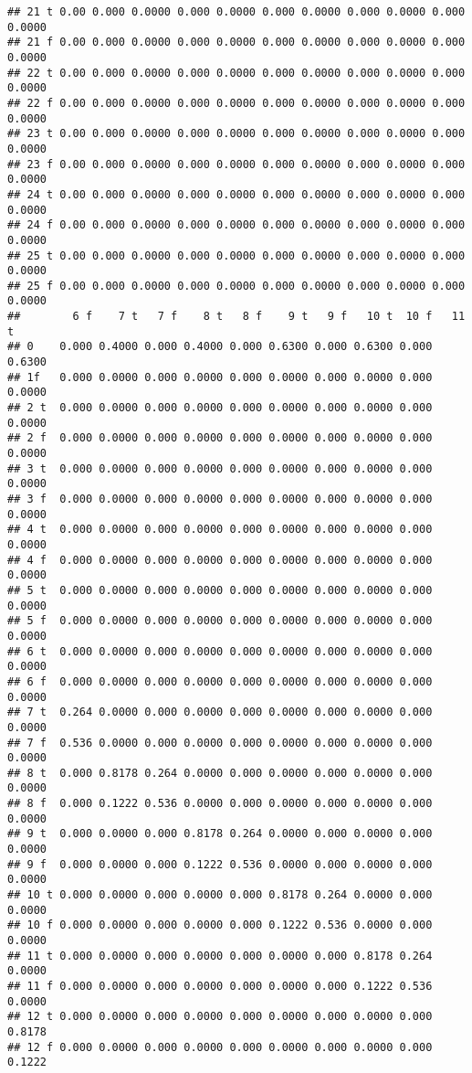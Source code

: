 \documentclass[]{article}
\begin{document}
\begin{verbatim}
## 21 t 0.00 0.000 0.0000 0.000 0.0000 0.000 0.0000 0.000 0.0000 0.000 0.0000
## 21 f 0.00 0.000 0.0000 0.000 0.0000 0.000 0.0000 0.000 0.0000 0.000 0.0000
## 22 t 0.00 0.000 0.0000 0.000 0.0000 0.000 0.0000 0.000 0.0000 0.000 0.0000
## 22 f 0.00 0.000 0.0000 0.000 0.0000 0.000 0.0000 0.000 0.0000 0.000 0.0000
## 23 t 0.00 0.000 0.0000 0.000 0.0000 0.000 0.0000 0.000 0.0000 0.000 0.0000
## 23 f 0.00 0.000 0.0000 0.000 0.0000 0.000 0.0000 0.000 0.0000 0.000 0.0000
## 24 t 0.00 0.000 0.0000 0.000 0.0000 0.000 0.0000 0.000 0.0000 0.000 0.0000
## 24 f 0.00 0.000 0.0000 0.000 0.0000 0.000 0.0000 0.000 0.0000 0.000 0.0000
## 25 t 0.00 0.000 0.0000 0.000 0.0000 0.000 0.0000 0.000 0.0000 0.000 0.0000
## 25 f 0.00 0.000 0.0000 0.000 0.0000 0.000 0.0000 0.000 0.0000 0.000 0.0000
##        6 f    7 t   7 f    8 t   8 f    9 t   9 f   10 t  10 f   11 t
## 0    0.000 0.4000 0.000 0.4000 0.000 0.6300 0.000 0.6300 0.000 0.6300
## 1f   0.000 0.0000 0.000 0.0000 0.000 0.0000 0.000 0.0000 0.000 0.0000
## 2 t  0.000 0.0000 0.000 0.0000 0.000 0.0000 0.000 0.0000 0.000 0.0000
## 2 f  0.000 0.0000 0.000 0.0000 0.000 0.0000 0.000 0.0000 0.000 0.0000
## 3 t  0.000 0.0000 0.000 0.0000 0.000 0.0000 0.000 0.0000 0.000 0.0000
## 3 f  0.000 0.0000 0.000 0.0000 0.000 0.0000 0.000 0.0000 0.000 0.0000
## 4 t  0.000 0.0000 0.000 0.0000 0.000 0.0000 0.000 0.0000 0.000 0.0000
## 4 f  0.000 0.0000 0.000 0.0000 0.000 0.0000 0.000 0.0000 0.000 0.0000
## 5 t  0.000 0.0000 0.000 0.0000 0.000 0.0000 0.000 0.0000 0.000 0.0000
## 5 f  0.000 0.0000 0.000 0.0000 0.000 0.0000 0.000 0.0000 0.000 0.0000
## 6 t  0.000 0.0000 0.000 0.0000 0.000 0.0000 0.000 0.0000 0.000 0.0000
## 6 f  0.000 0.0000 0.000 0.0000 0.000 0.0000 0.000 0.0000 0.000 0.0000
## 7 t  0.264 0.0000 0.000 0.0000 0.000 0.0000 0.000 0.0000 0.000 0.0000
## 7 f  0.536 0.0000 0.000 0.0000 0.000 0.0000 0.000 0.0000 0.000 0.0000
## 8 t  0.000 0.8178 0.264 0.0000 0.000 0.0000 0.000 0.0000 0.000 0.0000
## 8 f  0.000 0.1222 0.536 0.0000 0.000 0.0000 0.000 0.0000 0.000 0.0000
## 9 t  0.000 0.0000 0.000 0.8178 0.264 0.0000 0.000 0.0000 0.000 0.0000
## 9 f  0.000 0.0000 0.000 0.1222 0.536 0.0000 0.000 0.0000 0.000 0.0000
## 10 t 0.000 0.0000 0.000 0.0000 0.000 0.8178 0.264 0.0000 0.000 0.0000
## 10 f 0.000 0.0000 0.000 0.0000 0.000 0.1222 0.536 0.0000 0.000 0.0000
## 11 t 0.000 0.0000 0.000 0.0000 0.000 0.0000 0.000 0.8178 0.264 0.0000
## 11 f 0.000 0.0000 0.000 0.0000 0.000 0.0000 0.000 0.1222 0.536 0.0000
## 12 t 0.000 0.0000 0.000 0.0000 0.000 0.0000 0.000 0.0000 0.000 0.8178
## 12 f 0.000 0.0000 0.000 0.0000 0.000 0.0000 0.000 0.0000 0.000 0.1222

\end{verbatim}
\end{document}
